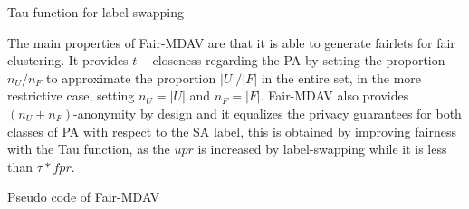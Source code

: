 
\begin{algorithm}[ht]

\caption{Tau function for label-swapping}
\label{alg:tau}
\end{algorithm}


The main properties of Fair-MDAV are that it is able to generate fairlets for fair clustering. It provides $t-$closeness regarding the PA by setting the proportion $n_U/n_F$ to approximate the proportion $|U|/|F|$ in the entire set, in the more restrictive case, setting $n_U=|U|$ and $n_F = |F|$. Fair-MDAV also provides $(n_U + n_F)$-anonymity by design and it equalizes the privacy guarantees for both classes of PA with respect to the SA label, this is obtained by improving fairness with the Tau function, as the $upr$ is increased by label-swapping while it is less than $\tau * fpr$.

\begin{algorithm}[ht]

\caption{Pseudo code of Fair-MDAV}
\label{alg:Fair-MDAV}
\end{algorithm}


